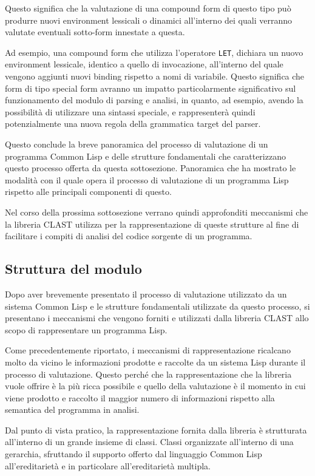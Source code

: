 Questo significa che la valutazione di una compound form di questo tipo può
produrre nuovi environment lessicali o dinamici all’interno dei quali verranno
valutate eventuali sotto-form innestate a questa.

Ad esempio, una compound form che utilizza l’operatore \texttt{LET}, dichiara un
nuovo environment lessicale, identico a quello di invocazione, all’interno del
quale vengono aggiunti nuovi binding rispetto a nomi di variabile. Questo
significa che form di tipo special form avranno un impatto particolarmente
significativo sul funzionamento del modulo di parsing e analisi, in quanto, ad
esempio, avendo la possibilità di utilizzare una sintassi speciale, e
rappresenterà quindi potenzialmente una nuova regola della grammatica target del
parser.

Questo conclude la breve panoramica del processo di valutazione di un programma
Common Lisp e delle strutture fondamentali che caratterizzano questo processo
offerta da questa sottosezione. Panoramica che ha mostrato le modalità con il
quale opera il processo di valutazione di un programma Lisp rispetto alle
principali componenti di questo.

Nel corso della prossima sottosezione verrano quindi approfonditi meccanismi che
la libreria CLAST utilizza per la rappresentazione di queste strutture al fine
di facilitare i compiti di analisi del codice sorgente di un programma.

\subsection{Struttura del modulo}

Dopo aver brevemente presentato il processo di valutazione utilizzato da un
sistema Common Lisp e le strutture fondamentali utilizzate da questo processo,
si presentano i meccanismi che vengono forniti e utilizzati dalla libreria CLAST
allo scopo di rappresentare un programma Lisp.

Come precedentemente riportato, i meccanismi di rappresentazione ricalcano
molto da vicino le informazioni prodotte e raccolte da un sistema Lisp durante
il processo di valutazione. Questo perché che la rappresentazione che la
libreria vuole offrire è la più ricca possibile e quello della valutazione è
il momento in cui viene prodotto e raccolto il maggior numero di informazioni
rispetto alla semantica del programma in analisi.

Dal punto di vista pratico, la rappresentazione fornita dalla libreria è
strutturata all’interno di un grande insieme di classi. Classi organizzate
all’interno di una gerarchia, sfruttando il supporto offerto dal linguaggio
Common Lisp all’ereditarietà e in particolare all’ereditarietà multipla.

